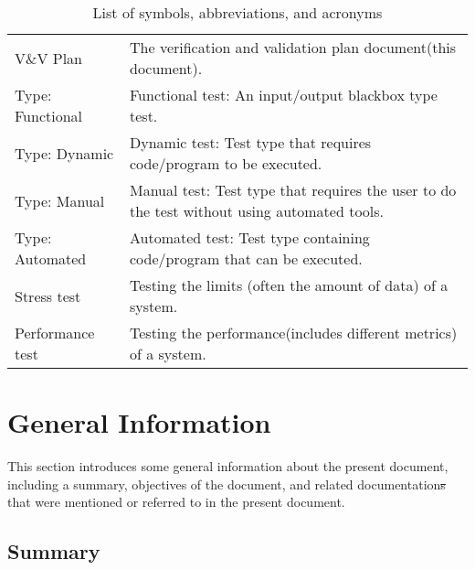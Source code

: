 \documentclass[12pt, titlepage]{article}
\begin{document}
\begin{table}[H]
\begin{tabular}{L{0.25\linewidth}L{0.8\linewidth}}
    V\&V Plan        & The verification and validation plan document(this document).                                                                                                                      \\
    Type: Functional & Functional test: An input/output blackbox type test.                                                                                                                               \\
    Type: Dynamic    & Dynamic test: Test type that requires code/program to be executed.                                                                                                                 \\
    Type: Manual     & Manual test: Test type that requires the user to do the test without using automated tools.                                                                                        \\
    Type: Automated  & Automated test: Test type containing code/program that can be executed.                                                                                                            \\
    Stress test      & Testing the limits (often the amount of data) of a system.                                                                                                                         \\
    Performance test & Testing the performance(includes different metrics) of a system.                                                                                                                   \\ \bottomrule
  \end{tabular}
  \caption{List of symbols, abbreviations, and acronyms}
  \label{tab:abbrv}
\end{table}
\newpage
{}

\section{General Information}

This section introduces some general information about the present document,
including a summary, objectives of the document, and related documentation\sout{s} that
were mentioned or referred to in the present document.

\subsection{Summary}
\end{document}
